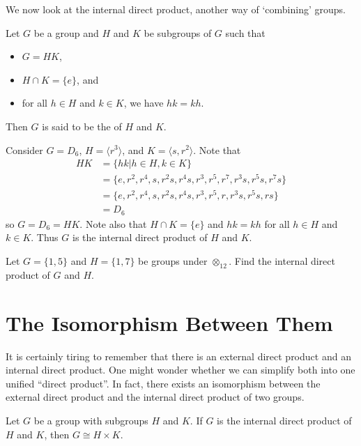 We now look at the internal direct product, another way of `combining' groups.

\begin{definition}
    Let $G$ be a group and $H$ and $K$ be subgroups of $G$ such that
    \begin{itemize}
        \item $G = HK$,
        \item $H \cap K = \{e\}$, and
        \item for all $h \in H$ and $k \in K$, we have $hk = kh$.
    \end{itemize}
    Then $G$ is said to be the  of $H$ and $K$.
\end{definition}

\begin{example}
    Consider $G = D_6$, $H = \langle r^3 \rangle$, and $K = \langle s, r^2 \rangle$. Note that
    \begin{align*}
        HK &= \{hk \vert h \in H, k \in K\}\\
        &= \{e, r^2, r^4, s, r^2s, r^4s, r^3, r^5, r^7, r^3s, r^5s, r^7s\}\\
        &= \{e, r^2, r^4, s, r^2s, r^4s, r^3, r^5, r, r^3s, r^5s, rs\}\\
        &= D_6
    \end{align*}
    so $G = D_6 = HK$. Note also that $H \cap K = \{e\}$ and $hk = kh$ for all $h \in H$ and $k \in K$. Thus $G$ is the internal direct product of $H$ and $K$.
\end{example}

\begin{exercise}
    Let $G = \{1, 5\}$ and $H = \{1, 7\}$ be groups under $\otimes_{12}$. Find the internal direct product of $G$ and $H$.
\end{exercise}

\section{The Isomorphism Between Them}
It is certainly tiring to remember that there is an external direct product and an internal direct product. One might wonder whether we can simplify both into one unified ``direct product''. In fact, there exists an isomorphism between the external direct product and the internal direct product of two groups.

\begin{theorem}\label{thrm-direct-product-equivalence}
    Let $G$ be a group with subgroups $H$ and $K$. If $G$ is the internal direct product of $H$ and $K$, then $G \cong H \times K$.
\end{theorem}

